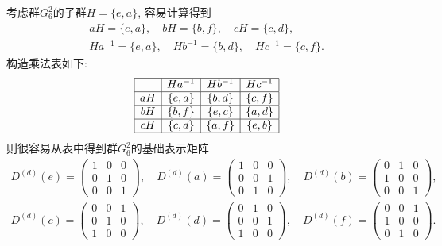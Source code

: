 \documentclass[UTF8]{ctexart}
\begin{document}
考虑群$G_6^2$的子群$H = \{e, a\}$, 容易计算得到
\begin{gather}
  a H = \{e, a\}, \quad b H = \{b, f\}, \quad c H = \{c, d\}, \\
  H a^{-1} = \{e, a\}, \quad H b^{-1} = \{b, d\}, \quad H c^{-1} = \{c, f\}.
\end{gather}
构造乘法表如下:
\begin{equation}
  \begin{array}{|c|c|c|c|}
    \hline
      & H a^{-1} & H b^{-1} & H c^{-1} \\
    \hline
    aH & \{e, a\} & \{b, d\} & \{c, f\} \\
    \hline
    bH & \{b, f\} & \{e, c\} & \{a, d\} \\
    \hline
    cH & \{c, d\} & \{a, f\} & \{e, b\} \\
    \hline
  \end{array}
\end{equation}
则很容易从表中得到群$G_6^2$的基础表示矩阵
\begin{gather}
  D^{(d)}(e) =
  \begin{pmatrix}
    1 & 0 & 0 \\
    0 & 1 & 0 \\
    0 & 0 & 1
  \end{pmatrix}, \quad D^{(d)}(a) =
  \begin{pmatrix}
    1 & 0 & 0 \\
    0 & 0 & 1 \\
    0 & 1 & 0
  \end{pmatrix}, \quad D^{(d)}(b) =
  \begin{pmatrix}
    0 & 1 & 0 \\
    1 & 0 & 0 \\
    0 & 0 & 1
  \end{pmatrix}, \\
  D^{(d)}(c) =
  \begin{pmatrix}
    0 & 0 & 1 \\
    0 & 1 & 0 \\
    1 & 0 & 0
  \end{pmatrix}, \quad D^{(d)}(d) =
  \begin{pmatrix}
    0 & 1 & 0 \\
    0 & 0 & 1 \\
    1 & 0 & 0
  \end{pmatrix}, \quad D^{(d)}(f) =
  \begin{pmatrix}
    0 & 0 & 1 \\
    1 & 0 & 0 \\
    0 & 1 & 0
  \end{pmatrix}.
\end{gather}
\end{document}
